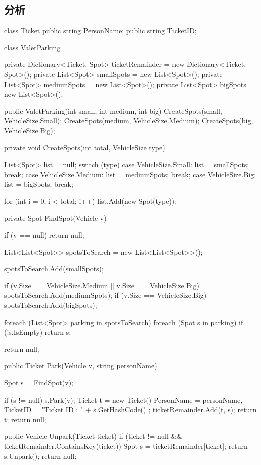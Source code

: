 \subsection{分析}
\begin{Code}
	class Ticket {
		public string PersonName;
		public string TicketID;
	}
	
	class ValetParking{
		private Dictionary<Ticket, Spot> ticketRemainder = new Dictionary<Ticket, Spot>();
		private List<Spot> smallSpots = new List<Spot>();
		private List<Spot> mediumSpots = new List<Spot>();
		private List<Spot> bigSpots = new List<Spot>();
		
		public ValetParking(int small, int medium, int big) {
			CreateSpots(small, VehicleSize.Small);
			CreateSpots(medium, VehicleSize.Medium);
			CreateSpots(big, VehicleSize.Big);
		}
		
		private void CreateSpots(int total, VehicleSize type) {
			List<Spot> list = null;
			switch (type) {
				case VehicleSize.Small:{
					list = smallSpots; break;
				}
				case VehicleSize.Medium:{
					list = mediumSpots; break;
				}
				case VehicleSize.Big:{
					list = bigSpots; break;
				}
			}
			
			for (int i = 0; i < total; i++){
				list.Add(new Spot(type));
			}
		}
		
		private Spot FindSpot(Vehicle v) {
			if (v == null) return null;
			
			List<List<Spot>> spotsToSearch = new List<List<Spot>>();
			
			spotsToSearch.Add(smallSpots);
			
			if (v.Size == VehicleSize.Medium || v.Size == VehicleSize.Big) {
				spotsToSearch.Add(mediumSpots);
			}
			if (v.Size == VehicleSize.Big){
				spotsToSearch.Add(bigSpots);
			}
			
			foreach (List<Spot> parking in spotsToSearch) {
				foreach (Spot s in parking){
					if (!s.IsEmpty) {
						return s;
					}
				}
			}
			
			return null;
		}
		
		public Ticket Park(Vehicle v, string personName) {
			
			Spot s = FindSpot(v);
			
			if (s != null) {
				s.Park(v);
				Ticket t = new Ticket() { PersonName = personName, TicketID = "Ticket ID : " + s.GetHashCode() };
				ticketRemainder.Add(t, s);	
				return t;
			}
			return null;
		} 
		
		public Vehicle Unpark(Ticket ticket) {
			if (ticket != null && ticketRemainder.ContainsKey(ticket)) {
				Spot s = ticketRemainder[ticket];
				return s.Unpark();
			}
			return null;
		}
	}
	

\end{Code}
